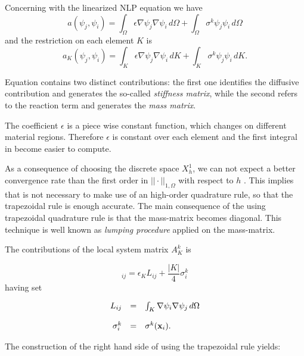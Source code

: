 Concerning with the linearized NLP equation we have
\begin{equation}
a(\psi_j,\psi_i)  = \int_{\Omega} \epsilon \nabla \psi_j \nabla \psi_i \, d\Omega + \int_{\Omega} \sigma^{k}\psi_j \psi_i \, d\Omega 
\end{equation}
and the restriction on each element $K$ is
\begin{equation}
\label{eq: bilinear local discrete}
a_K(\psi_j,\psi_i)  = \int_{K} \epsilon \nabla \psi_j \nabla \psi_i \, dK + \int_{K} \sigma^{k}\psi_j \psi_i \, dK .
\end{equation}

Equation  contains two distinct contributions: the first one identifies the diffusive contribution and generates the so-called \textit{stiffness matrix}, while the second refers to the reaction term and generates the \textit{mass matrix}.

The coefficient $\epsilon$ is a piece wise constant function, which changes on different material regions. Therefore $\epsilon$ is constant over each element and the first integral in  become easier to compute.

As a consequence of choosing the discrete space $X^1_{h}$,  we can not expect a better convergence rate than the first order in $||\cdot||_{1,\Omega}$ with respect to $h$ \cite{quarteroni:NumApprox}. This implies that is not necessary to make use of an high-order quadrature rule, so that the trapezoidal rule is enough accurate. 
The main consequence of the using trapezoidal quadrature rule is that the mass-matrix becomes diagonal.
This technique is well known as \textit{lumping procedure} applied on the mass-matrix.

The contributions of the local system matrix $A_K^k$ is

\begin{equation}
[A_K^k]_{ij}  = \epsilon_K
L_{ij}
+
\dfrac{|K|}{4} \sigma^k_i
\end{equation}
having set

\begin{equation}
\begin{array}{rcl}
L_{ij} & = & \int_K \nabla \psi_i  \nabla \psi_j \, d\Omega \\ \\
\sigma^k_i & =  &\sigma^k(\mathbf{x}_i) .
\end{array}
\end{equation}

The construction of the right hand side of  using the trapezoidal rule yields:

